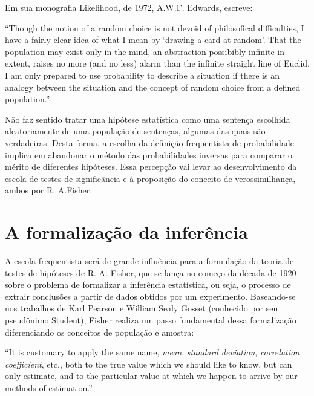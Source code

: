 Em sua monografia Likelihood, de 1972, A.W.F. Edwards, escreve:

``Though the notion of a random choice is not devoid of philosofical difficulties, I have a fairly clear idea of what I mean
by `drawing a card at random'. That the population may exist only in the mind, an abstraction possibibly infinite in extent,
raises no more (and no less) alarm than the infinite straight line of Euclid. I am only prepared to use probability to describe
a situation if there is an analogy between the situation and the concept of random choice from a defined population.''
\citep{Edwards72}

Não faz sentido tratar uma hipótese estatística como uma sentença escolhida aleatoriamente de uma população de sentenças, algumas
das quais são verdadeiras. Desta forma, a escolha da definição frequentista de probabilidade implica em abandonar o método
das probabilidades inversas para comparar o mérito de diferentes hipóteses. Essa percepção vai levar ao desenvolvimento
da escola de testes de significância e à proposição do conceito de verossimilhança, ambos por R. A.Fisher.

\section{A formalização da inferência}

A escola frequentista será de grande influência para a formulação da teoria de testes de hipóteses de R. A. Fisher, que se
lança no começo da década de 1920 sobre o problema de formalizar a inferência estatística, ou seja, o processo de
extrair conclusões a partir de dados obtidos por um experimento. Baseando-se nos trabalhos de Karl Pearson e William Sealy Gosset
(conhecido por seu pseudônimo Student), Fisher realiza um passo fundamental dessa formalização
diferenciando os conceitos de população e amostra:

``It is customary to apply the same name, {\em mean}, {\em standard deviation}, {\em correlation coefficient}, etc., both 
to the true value which we should like to know, but can only estimate, and to the particular value at which we happen 
to arrive by our methods of estimation.''\citep{Fisher1922}

